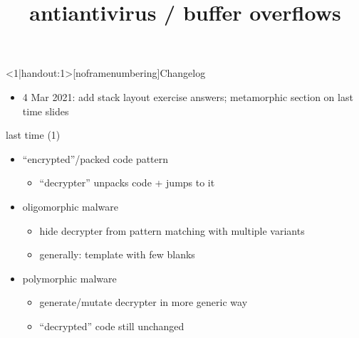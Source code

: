 \graphicspath{{./figures/}}
\title{antiantivirus / buffer overflows}
\date{}

\begin{frame}
    \titlepage
\end{frame}

{
\begin{frame}<1|handout:1>[noframenumbering]{Changelog}
    \begin{itemize}
    \item 4 Mar 2021: add stack layout exercise answers; metamorphic section on last time slides
    \end{itemize}
\end{frame}
}


\begin{frame}{last time (1)}
    \begin{itemize}
    \item ``encrypted''/packed code pattern 
        \begin{itemize}
        \item ``decrypter'' unpacks code + jumps to it
        \end{itemize}
    \item oligomorphic malware
        \begin{itemize}
        \item hide decrypter from pattern matching with multiple variants
        \item generally: template with few blanks
        \end{itemize}
    \item polymorphic malware
        \begin{itemize}
        \item generate/mutate decrypter in more generic way
        \item ``decrypted'' code still unchanged
        \end{itemize}
    \end{itemize}
\end{frame}

